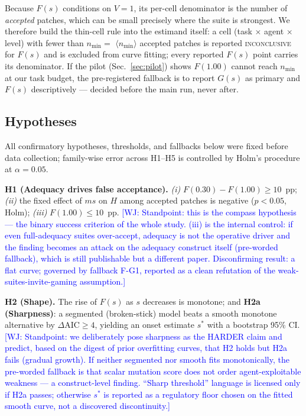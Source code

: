 \documentclass[conference]{IEEEtran}
\newcommand{\PH}[1]{\colorbox{gray!18}{\small$\langle$#1$\rangle$}}
\newcommand{\wj}[1]{\textcolor{blue}{\footnotesize [WJ: #1]}}
\newcommand{\ms}{\ensuremath{\mathit{ms}}}
\newcommand{\Fs}{\ensuremath{F(s)}}
\newcommand{\Gs}{\ensuremath{G(s)}}
\begin{document}
Because \Fs{} conditions on $V{=}1$, its per-cell denominator is the
number of \emph{accepted} patches, which can be small precisely where the
suite is strongest. We therefore build the thin-cell rule into the
estimand itself: a cell (task $\times$ agent $\times$ level) with fewer
than $n_{\min} =$ \PH{$n_{\min}$} accepted patches is reported
\textsc{inconclusive} for \Fs{} and is excluded from curve fitting; every
reported \Fs{} point carries its denominator. If the pilot
(Sec.~\ref{sec:pilot}) shows $F(1.00)$ cannot reach $n_{\min}$ at our task
budget, the pre-registered fallback is to report \Gs{} as primary and
\Fs{} descriptively --- decided before the main run, never after.

\subsection{Hypotheses}\label{sec:hypotheses}
All confirmatory hypotheses, thresholds, and fallbacks below were fixed
before data collection; family-wise error across H1--H5 is controlled by
Holm's procedure at $\alpha = 0.05$.

\medskip\noindent
\textbf{H1 (Adequacy drives false acceptance).} \emph{(i)}
$F(0.30) - F(1.00) \ge 10$~pp; \emph{(ii)} the fixed effect of \ms{} on
$H$ among accepted patches is negative ($p < 0.05$, Holm); \emph{(iii)}
$F(1.00) \le 10$~pp.
\wj{Standpoint: this is the compass hypothesis --- the binary success
criterion of the whole study. (iii) is the internal control: if even
full-adequacy suites over-accept, adequacy is not the operative driver and
the finding becomes an attack on the adequacy construct itself
(pre-worded fallback), which is still publishable but a different paper.
Disconfirming result: a flat curve; governed by fallback F-G1, reported as
a clean refutation of the weak-suites-invite-gaming assumption.}

\medskip\noindent
\textbf{H2 (Shape).} The rise of \Fs{} as $s$ decreases is monotone; and
\textbf{H2a (Sharpness)}: a segmented (broken-stick) model beats a smooth
monotone alternative by $\Delta\mathrm{AIC} \ge 4$, yielding an onset
estimate $s^\ast$ with a bootstrap 95\% CI.
\wj{Standpoint: we deliberately pose sharpness as the HARDER claim and
predict, based on the digest of prior overfitting curves, that H2 holds
but H2a fails (gradual growth). If neither segmented nor smooth fits
monotonically, the pre-worded fallback is that scalar mutation score does
not order agent-exploitable weakness --- a construct-level finding.
``Sharp threshold'' language is licensed only if H2a passes; otherwise
$s^\ast$ is reported as a regulatory floor chosen on the fitted smooth
curve, not a discovered discontinuity.}
\end{document}
